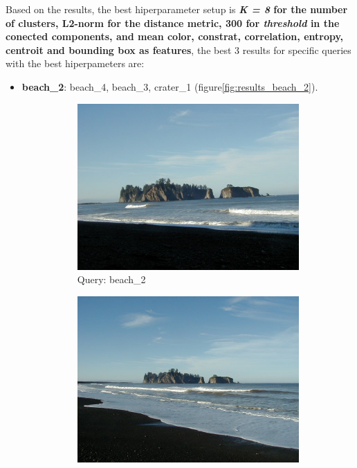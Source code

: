Based on the results, the best hiperparameter setup is \textbf{\textit{K = 8} for the number of clusters, L2-norm for the distance metric, 300 for \textit{threshold} in the conected components, and mean color, constrat, correlation, entropy, centroit and bounding box as features}, the best 3 results for  specific queries with the best hiperpameters are:

\begin{itemize}
\item \textbf{beach\_2}: beach\_4, beach\_3, crater\_1 (figure\ref{fig:results_beach_2}).

\begin{figure}[H]
	\centering
	\begin{subfigure}{0.25\textwidth}
	  \centering
	  \includegraphics[width=0.9\linewidth]{../input/beach_2.jpg}
	  \caption{Query: beach\_2}
	\end{subfigure}%
	\begin{subfigure}{0.25\textwidth}
	  \centering
	  \includegraphics[width=0.9\linewidth]{../input/beach_4.jpg}

\end{subfigure}
\end{figure}
\end{itemize}
